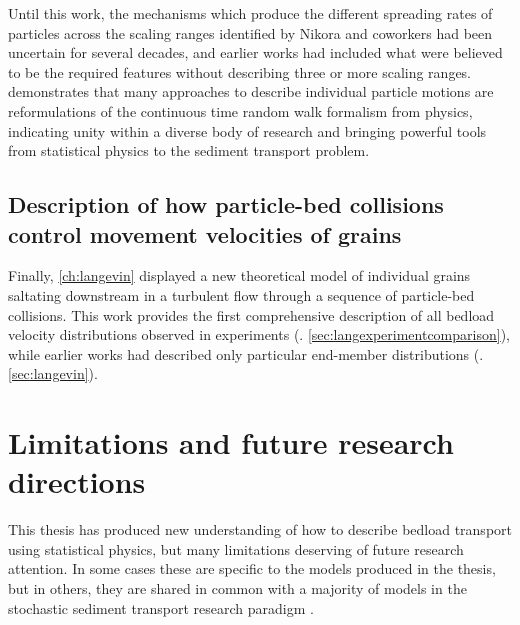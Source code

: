 Until this work, the mechanisms which produce the different spreading rates of particles across the scaling ranges identified by Nikora and coworkers had been uncertain for several decades, and earlier works had included what were believed to be the required features without describing three or more scaling ranges.
\DIFdelbegin {}\DIFdelend \DIFaddbegin {}\DIFaddend demonstrates that many approaches to describe individual particle motions are reformulations of the continuous time random walk formalism from physics, indicating \DIFdelbegin {}\DIFdelend unity within a diverse body of research and bringing powerful tools from statistical physics to the sediment transport problem.

\subsection{Description of how particle-bed collisions control movement velocities of grains}

Finally, \DIFdelbegin {}\DIFdelend \DIFaddbegin {}\DIFaddend \ref{ch:langevin} displayed a new theoretical model of individual grains saltating downstream in a turbulent flow through a sequence of particle-bed collisions.
This work provides the first comprehensive description of all bedload velocity distributions \DIFaddbegin {}\DIFaddend observed in experiments (\DIFdelbegin {}\DIFdelend \DIFaddbegin {}\DIFaddend . \ref{sec:langexperimentcomparison}), while earlier works had described only particular end-member distributions (\DIFdelbegin {}\DIFdelend \DIFaddbegin {}\DIFaddend . \ref{sec:langevin}).
\DIFaddbegin {}\DIFaddend 

\section{Limitations and future research directions}

This thesis has produced new understanding of how to describe bedload transport using statistical physics, but \DIFdelbegin {}\DIFdelend \DIFaddbegin {}\DIFaddend many limitations deserving of future research attention.
In some cases these are specific to the models produced in the thesis, but in others, they are shared in common with a majority of models in the stochastic sediment transport research paradigm \DIFdelbegin {}\DIFdelend \DIFaddbegin {}\DIFaddend .

